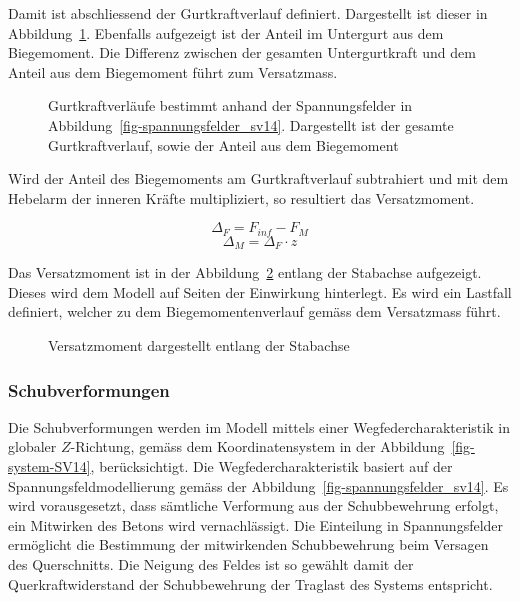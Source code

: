 \documentclass[
  11pt,
  letterpaper,
]{scrreprt}
\begin{document}
Damit ist abschliessend der Gurtkraftverlauf definiert. Dargestellt ist
dieser in Abbildung~\ref{fig-gurtkraft_sv14}. Ebenfalls aufgezeigt ist
der Anteil im Untergurt aus dem Biegemoment. Die Differenz zwischen der
gesamten Untergurtkraft und dem Anteil aus dem Biegemoment führt zum
Versatzmass.

\begin{figure}[H]


\caption{\label{fig-gurtkraft_sv14}Gurtkraftverläufe bestimmt anhand der
Spannungsfelder in Abbildung~\ref{fig-spannungsfelder_sv14}. Dargestellt
ist der gesamte Gurtkraftverlauf, sowie der Anteil aus dem Biegemoment}

\end{figure}%

Wird der Anteil des Biegemoments am Gurtkraftverlauf subtrahiert und mit
dem Hebelarm der inneren Kräfte multipliziert, so resultiert das
Versatzmoment.

\[
\Delta_F = F_{inf} - F_M
\] \[
\Delta_M = \Delta_F \cdot z
\]

Das Versatzmoment ist in der Abbildung~\ref{fig-versatzmoment_sv14}
entlang der Stabachse aufgezeigt. Dieses wird dem Modell auf Seiten der
Einwirkung hinterlegt. Es wird ein Lastfall definiert, welcher zu dem
Biegemomentenverlauf gemäss dem Versatzmass führt.

\begin{figure}[H]


\caption{\label{fig-versatzmoment_sv14}Versatzmoment dargestellt entlang
der Stabachse}

\end{figure}%

\subsubsection{Schubverformungen}\label{schubverformungen-1}

Die Schubverformungen werden im Modell mittels einer
Wegfedercharakteristik in globaler \(Z\)-Richtung, gemäss dem
Koordinatensystem in der Abbildung~\ref{fig-system-SV14},
berücksichtigt. Die Wegfedercharakteristik basiert auf der
Spannungsfeldmodellierung gemäss der
Abbildung~\ref{fig-spannungsfelder_sv14}. Es wird vorausgesetzt, dass
sämtliche Verformung aus der Schubbewehrung erfolgt, ein Mitwirken des
Betons wird vernachlässigt. Die Einteilung in Spannungsfelder ermöglicht
die Bestimmung der mitwirkenden Schubbewehrung beim Versagen des
Querschnitts. Die Neigung des Feldes ist so gewählt damit der
Querkraftwiderstand der Schubbewehrung der Traglast des Systems
entspricht.
\end{document}
